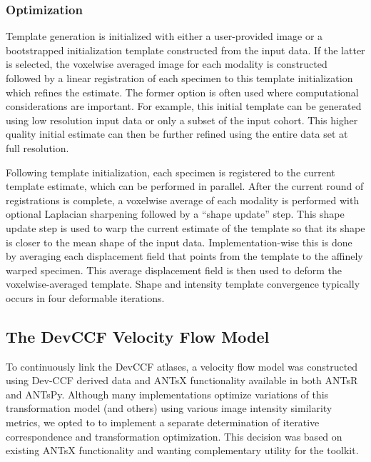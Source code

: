 \documentclass[
  12pt,
]{article}
\begin{document}
\hypertarget{optimization}{%
\subsubsection*{Optimization}\label{optimization}}

Template generation is initialized with either a user-provided image or
a bootstrapped initialization template constructed from the input data.
If the latter is selected, the voxelwise averaged image for each
modality is constructed followed by a linear registration of each
specimen to this template initialization which refines the estimate. The
former option is often used where computational considerations are
important. For example, this initial template can be generated using low
resolution input data or only a subset of the input cohort. This higher
quality initial estimate can then be further refined using the entire
data set at full resolution.

Following template initialization, each specimen is registered to the
current template estimate, which can be performed in parallel. After the
current round of registrations is complete, a voxelwise average of each
modality is performed with optional Laplacian sharpening followed by a
``shape update'' step. This shape update step is used to warp the
current estimate of the template so that its shape is closer to the mean
shape of the input data. Implementation-wise this is done by averaging
each displacement field that points from the template to the affinely
warped specimen. This average displacement field is then used to deform
the voxelwise-averaged template. Shape and intensity template
convergence typically occurs in four deformable iterations.

\hypertarget{the-devccf-velocity-flow-model}{%
\subsection*{The DevCCF Velocity Flow
Model}\label{the-devccf-velocity-flow-model}}

To continuously link the DevCCF atlases, a velocity flow model was
constructed using Dev-CCF derived data and ANTsX functionality available
in both ANTsR and ANTsPy. Although many implementations optimize
variations of this transformation model (and others) using various image
intensity similarity metrics, we opted to to implement a separate
determination of iterative correspondence and transformation
optimization. This decision was based on existing ANTsX functionality
and wanting complementary utility for the toolkit.
\end{document}
